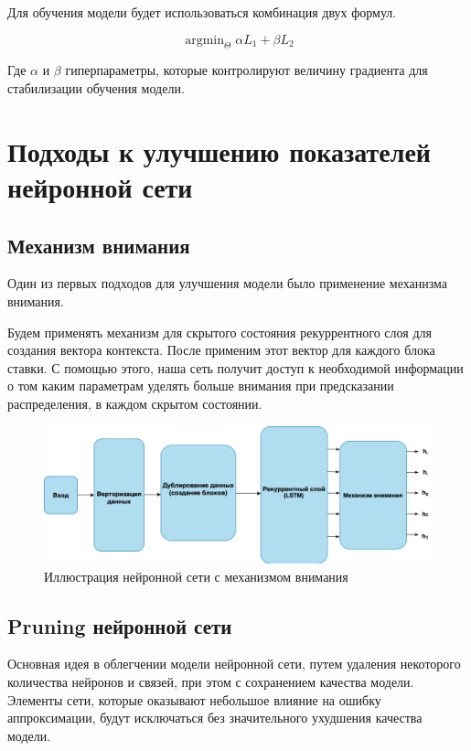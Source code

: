 \documentclass[times,specification,annotation]{itmo-student-thesis}
\DeclareMathOperator*{\argmin}{argmin}
\begin{document}
Для обучения модели будет использоваться комбинация двух формул.

\begin{equation}
    \argmin_{\Theta} \alpha L_1 + \beta L_2
\end{equation}

Где $\alpha$ и $\beta$ гиперпараметры, которые контролируют величину градиента для стабилизации обучения модели.

\section{Подходы к улучшению показателей нейронной сети}

\subsection{Механизм внимания}

Один из первых подходов для улучшения модели было применение механизма внимания.

Будем применять механизм для скрытого состояния рекуррентного слоя для создания вектора контекста. 
После применим этот вектор для каждого блока ставки. 
С помощью этого, наша сеть получит доступ к необходимой информации 
о том каким параметрам уделять больше внимания при предсказании распределения, в каждом скрытом состоянии.

\begin{figure}[h]
    \caption{Иллюстрация нейронной сети с механизмом внимания}
    \centering
    \includegraphics{nn_attention.png}
\end{figure}

\subsection{Pruning нейронной сети}

Основная идея в облегчении модели нейронной сети, путем удаления некоторого количества нейронов и связей, при этом с сохранением качества модели. 
Элементы сети, которые оказывают небольшое влияние на ошибку аппроксимации, будут исключаться без значительного ухудшения качества модели.
\end{document}

